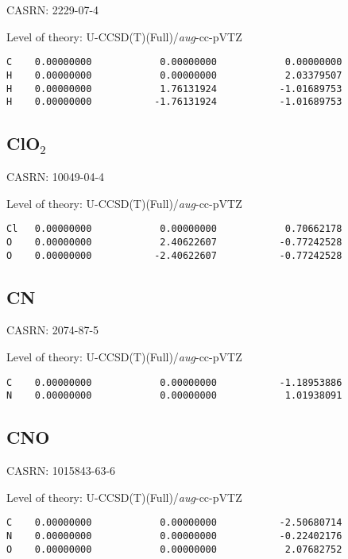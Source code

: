 \documentclass[journal=jctcce,manuscript=article,layout=traditional]{achemso}
\newcommand{\AVTZ}{\emph{aug}-cc-pVTZ}
\begin{document}
CASRN: 2229-07-4

\begin{singlespace}
\noindent Level of theory: U-CCSD(T)(Full)/{\AVTZ}
\begin{verbatim}
C    0.00000000            0.00000000            0.00000000
H    0.00000000            0.00000000            2.03379507
H    0.00000000            1.76131924           -1.01689753
H    0.00000000           -1.76131924           -1.01689753
\end{verbatim}
\end{singlespace}

\subsection{ClO$_2$}

CASRN: 10049-04-4

\begin{singlespace}
\noindent Level of theory: U-CCSD(T)(Full)/{\AVTZ}
\begin{verbatim}
Cl   0.00000000            0.00000000            0.70662178
O    0.00000000            2.40622607           -0.77242528
O    0.00000000           -2.40622607           -0.77242528
\end{verbatim}
\end{singlespace}
 
 
 \subsection{CN}

CASRN: 2074-87-5

\begin{singlespace}
\noindent Level of theory: U-CCSD(T)(Full)/{\AVTZ}
\begin{verbatim}
C    0.00000000            0.00000000           -1.18953886
N    0.00000000            0.00000000            1.01938091
\end{verbatim}
\end{singlespace}

\subsection{CNO}

CASRN: 1015843-63-6

\begin{singlespace}
\noindent Level of theory: U-CCSD(T)(Full)/{\AVTZ}
\begin{verbatim}
C    0.00000000            0.00000000           -2.50680714
N    0.00000000            0.00000000           -0.22402176
O    0.00000000            0.00000000            2.07682752
\end{verbatim}
\end{singlespace}
\end{document}
